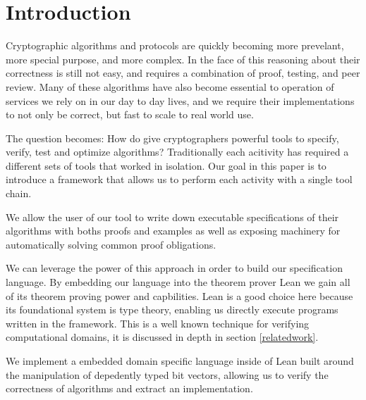 \section{Introduction}

Cryptographic algorithms and protocols are quickly becoming more prevelant,
more special purpose, and more complex. In the face of this reasoning about their
correctness is still not easy, and requires a combination of proof, testing,
and peer review. Many of these algorithms have also become essential to
operation of services we rely on in our day to day lives, and we
require their implementations to not only be correct, but fast to scale to
real world use.

The question becomes: How do give cryptographers powerful tools to specify, verify,
test and optimize algorithms? Traditionally each acitivity has required a different
sets of tools that worked in isolation. Our goal in this paper is to introduce
a framework that allows us to perform each activity with a single tool chain.

We allow the user of our tool to write down executable specifications of
their algorithms with boths proofs and examples as well as exposing machinery for
automatically solving common proof obligations.

We can leverage the power of this approach in order to build our
specification language. By embedding our language into the theorem prover Lean
we gain all of its theorem proving power and capbilities. Lean is a good choice here because
its foundational system is type theory, enabling us directly execute programs
written in the framework. This is a well known technique for verifying
computational domains, it is discussed in depth in section \ref{relatedwork}.

We implement a embedded domain specific language inside of Lean built around
the manipulation of depedently typed bit vectors, allowing us to verify
the correctness of algorithms and extract an implementation.

